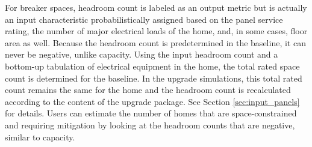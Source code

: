 For breaker spaces, headroom count is labeled as an output metric but is actually an input characteristic probabilistically assigned based on the panel service rating, the number of major electrical loads of the home, and, in some cases, floor area as well. Because the headroom count is predetermined in the baseline, it can never be negative, unlike capacity. Using the input headroom count and a bottom-up tabulation of electrical equipment in the home, the total rated space count is determined for the baseline. In the upgrade simulations, this total rated count remains the same for the home and the headroom count is recalculated according to the content of the upgrade package. See Section \ref{sec:input_panels} for details. Users can estimate the number of homes that are space-constrained and requiring mitigation by looking at the headroom counts that are negative, similar to capacity. 
